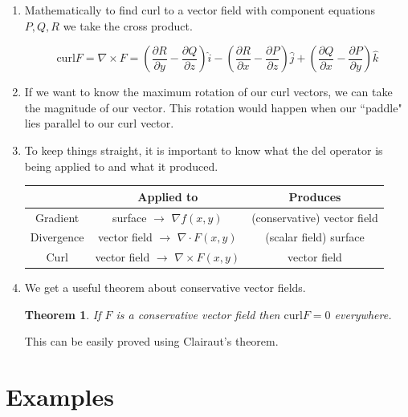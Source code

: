 \documentclass[11pt]{article}
\newtheorem{theorem}{Theorem}
\begin{document}
\begin{enumerate}
\item Mathematically to find curl to a vector field with component equations $P,Q,R$ we take the cross product. 

\begin{equation*}
    \text{curl} F = \nabla \times F = \left(\frac{\partial R}{\partial y}- \frac{\partial Q}{\partial z}\right)\hat{i}-\left(\frac{\partial R}{\partial x}- \frac{\partial P}{\partial z}\right)\hat{j}+\left(\frac{\partial Q}{\partial x}- \frac{\partial P}{\partial y}\right)\hat{k}
\end{equation*}

\item If we want to know the maximum rotation of our curl vectors, we can take the magnitude of our vector. This rotation would happen when our ``paddle" lies parallel to our curl vector. 



\item To keep things straight, it is important to know what the del operator is being applied to and what it produced.

\begin{center}
\begin{tabular}{|c|c|c|}
\hline
  & Applied to   & Produces \\
  \hline \hline
 Gradient &  surface $\to$ $\nabla f(x,y)$   & (conservative) vector field\\
  \hline
  Divergence & vector field $\to$ $\nabla \cdot F(x,y)$ & (scalar field) surface \\
  \hline
  Curl & vector field $\to$ $\nabla \times F(x,y)$ & vector field\\
  \hline \hline
\end{tabular}
\end{center}


\item We get a useful theorem about conservative vector fields.

\begin{theorem}
    If $F$ is a conservative vector field then $\text{curl}F = 0$ everywhere.
\end{theorem}

This can be easily proved using Clairaut's theorem. 
\end{enumerate}


\newpage

\section{Examples}
\end{document}
